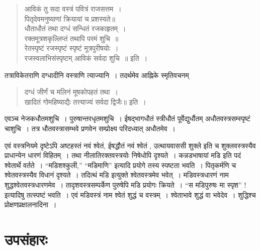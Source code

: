 {\begin{verse}
आविकं तु सदा वस्त्रं पवित्रं राजसत्तम~। \\
पितृदेवमनुष्याणां क्रियायां च प्रशस्यते॥ \\
धौताधौतं तथा दग्धं सन्धितं रजकाहृतम्~। \\
रक्तमूत्रशकृल्लिप्तं तथापि परमं शुचि~॥\\
रेतस्पृष्टं रजस्पृष्टं स्पृष्टं मूत्रपुरीषयोः~। \\
रजस्वलाभिसंस्पृष्टम् आविकं सर्वदा शुचि~॥ इति~। 
\end{verse}
तत्राविकेतराणि दग्धादीनि वस्त्राणि त्याज्यानि~। तदर्थमेव आह्निके स्मृतिवचनम्  \enginline{-}
\begin{verse}
दग्धं जीर्णं च मलिनं मूषकोपहतं तथा~। \\
खादितं गोमहिष्याद्यैः तत्त्याज्यं सर्वदा द्विजैः॥ इति~। 
\end{verse}
एवञ्च नेजकधौतमशुचि~। पुरुषान्तरधृतमशुचि~। ईषद्भागधौतं स्त्रीधौतं पूर्वेद्युर्धौतम् अधौतवस्त्रसम्स्पृष्टं चाशुचि~। तत्र धौतवस्त्रासम्भवे प्रणवेन सम्प्रोक्ष्य परिदध्यात् अधौतमेव~। 

एवं वस्त्रनियमे दृष्टेऽपि अष्टहस्तं नवं श्वेतं, ईषद्धौतं नवं श्वेतं , उत्थायवाससी शुक्ले इति च शुक्लवस्त्रस्यैव प्राधान्येन धारणं विहितम्~। तथा नीलातिरक्तवस्त्रयोः निषेधोपि दृश्यते~। कन्नडभाषायां मडि इति पदं श्वेतार्थे वर्तते~। “मडिशश्कुली,” “मडिमाणि” इत्यादि प्रयोगे तस्य स्पष्टता भवति~। पितृकर्मणि च श्वेतवस्त्रस्यैव विधानं दृश्यते~। तदित्थं मडि इत्युक्ते श्वेतवस्त्रमेव भवेत्~। मडिवस्त्रधारणं नाम शुद्धश्वेतवस्त्रधारणमेव~। तादृशवस्त्रसम्पर्केण पुरुषेपि मडि प्रयोगः क्रियते~। “स मडिपुरुषः मा स्पृश” ! इत्यादिषु तत्स्पष्टं भवति~। एवं मडिवस्त्रं नाम श्वेतं शुद्धं च वस्त्रम्~। श्वेताभावे शुद्धं वा भवेदेव~। शुद्धिश्च प्रोक्षणप्रक्षालनादिना~। 
~\\[-1cm]
\section*{उपसंहारः} 

}
